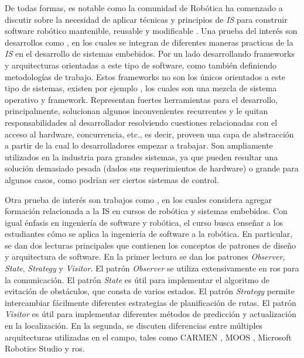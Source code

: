 De todas formas, es notable como la comunidad de Robótica ha comenzado a discutir sobre la necesidad de aplicar técnicas y principios de \textit{IS} para construir software robótico mantenible, reusable y modificable \cite{mejoras-1, mejoras-2}. Una prueba del interés son desarrollos como \cite{FernandezMadrigal2003, model,model1,model2,model3}, en los cuales se integran de diferentes maneras practicas de la \textit{IS} en el desarrollo de sistemas embebidos. Por un lado desarrollando \glspl{framework} y arquitecturas orientadas a este tipo de software, como también definiendo metodologías de trabajo. Estos \glspl{framework} no son los únicos orientados a este tipo de sistemas, existen por ejemplo \cite{framework-1, framework-ros}, los cuales son una mezcla de sistema operativo y framework. Representan fuertes herramientas para el desarrollo, principalmente, solucionan algunos inconvenientes recurrentes y le quitan responsabilidades al desarrollador resolviendo cuestiones relacionadas con el acceso al hardware, concurrencia, etc., es decir, proveen una capa de abstracción a partir de la cual lo desarrolladores empezar a trabajar. Son ampliamente utilizados en la industria para grandes sistemas, ya que pueden resultar una solución demasiado pesada (dados sus requerimientos de hardware) o grande para algunos casos, como podrían ser ciertos sistemas de control.

Otra prueba de interés son trabajos como \cite{Shin15fase}, en los cuales considera agregar formación relacionada a la IS en cursos de robótica y sistemas embebidos. Con igual énfasis en ingeniería de software y robótica, el curso busca enseñar a los estudiantes cómo se aplica la ingeniería de software a la robótica. En particular, se dan dos lecturas principales que contienen los conceptos de patrones de diseño y arquitectura de software. En la primer lectura se dan los patrones \textit{Observer}, \textit{State}, \textit{Strategy} y \textit{Visitor}. El patrón \textit{Observer} se utiliza extensivamente en \gls{ros} para la comunicación. El patrón \textit{State} es útil para implementar el algoritmo de evitación de obstáculos, que consta de varios estados. El patrón \textit{Strategy} permite intercambiar fácilmente diferentes estrategias de planificación de rutas. El patrón \textit{Visitor} es útil para implementar diferentes métodos de predicción y actualización en la localización. En la segunda, se discuten diferencias entre múltiples arquitecturas utilizadas en el campo, tales como CARMEN \cite{carmen}, MOOS \cite{moos}, Microsoft Robotics Studio \cite{microsoft} y \gls{ros}. 

